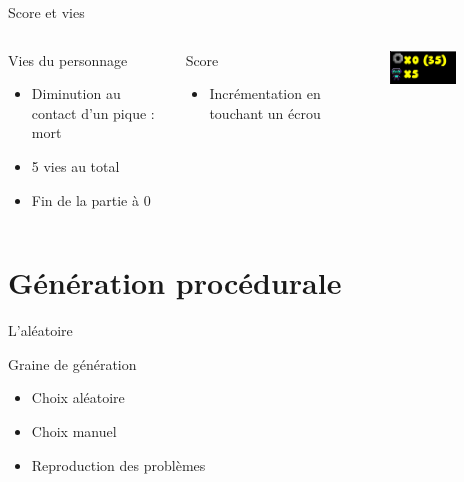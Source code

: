 \documentclass{beamer}
\begin{document}
{\begin{frame}{Score et vies}
    \begin{columns}
            \begin{block}{Vies du personnage}
                \begin{itemize}
                    \item[\bullet] Diminution au contact d'un pique : mort
                    \item[\bullet] 5 vies au total
                    \item[\bullet] Fin de la partie à 0
                \end{itemize}
            \end{block}
            \begin{block}{Score}
                \begin{itemize}
                    \item[\bullet] Incrémentation en touchant un écrou
                \end{itemize}
            \end{block}
            \begin{figure}
                \centering
                \includegraphics[width=0.8\textwidth]{Screenshot from 2025-03-23 23-14-37}
            \end{figure}
    \end{columns}
\end{frame}

\section{Génération procédurale}
\begin{frame}{L'al\'eatoire}
    \begin{block}{Graine de génération}
        \begin{itemize}
            \item[\bullet] Choix aléatoire
            \item[\bullet] Choix manuel
            \item[\bullet] Reproduction des problèmes
        \end{itemize}
    \end{block}
\end{frame}

}
\end{document}
